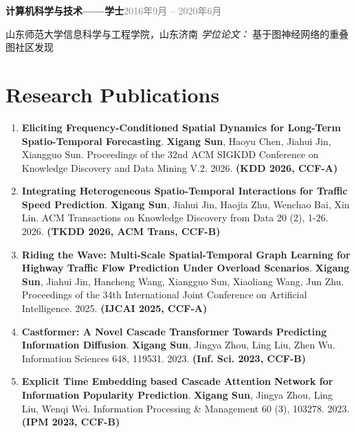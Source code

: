 \documentclass[11pt,a4paper,UTF8]{ctexart}
\newcommand{\cvdate}[1]{{\small\textcolor{gray}{#1}}}
\newcommand{\cvitem}[2]{\textbf{#1}\hfill\cvdate{#2}}
\begin{document}
\vspace{2pt}

\noindent
\cvitem{\textbf{计算机科学与技术——学士}}{2016年9月 -- 2020年6月}

\noindent
\hspace*{1em} 山东师范大学信息科学与工程学院，山东济南
\hspace*{1em} \textit{学位论文：} 基于图神经网络的重叠图社区发现

\section{Research Publications}

\begin{enumerate}
    \item
    \textbf{Eliciting Frequency-Conditioned Spatial Dynamics for Long-Term Spatio-Temporal Forecasting}. \textbf{Xigang Sun}, Haoyu Chen, Jiahui Jin, Xiangguo Sun. Proceedings of the 32nd ACM SIGKDD Conference on Knowledge Discovery and Data Mining V.2. 2026. \textbf{(KDD 2026, CCF-A)}

    \item
    \textbf{Integrating Heterogeneous Spatio-Temporal Interactions for Traffic Speed Prediction}. \textbf{Xigang Sun}, Jiahui Jin, Haojia Zhu, Wenchao Bai, Xin Lin. ACM Transactions on Knowledge Discovery from Data 20 (2), 1-26. 2026. \textbf{(TKDD 2026, ACM Trans, CCF-B)}

    \item
    \textbf{Riding the Wave: Multi-Scale Spatial-Temporal Graph Learning for Highway Traffic Flow Prediction Under Overload Scenarios}. \textbf{Xigang Sun}, Jiahui Jin, Hancheng Wang, Xiangguo Sun, Xiaoliang Wang, Jun Zhu. Proceedings of the 34th International Joint Conference on Artificial Intelligence. 2025. \textbf{(IJCAI 2025, CCF-A)}

    \item
    \textbf{Castformer: A Novel Cascade Transformer Towards Predicting Information Diffusion}. \textbf{Xigang Sun}, Jingya Zhou, Ling Liu, Zhen Wu. Information Sciences 648, 119531. 2023. \textbf{(Inf. Sci. 2023, CCF-B)}

    \item
    \textbf{Explicit Time Embedding based Cascade Attention Network for Information Popularity Prediction}. \textbf{Xigang Sun}, Jingya Zhou, Ling Liu, Wenqi Wei. Information Processing \& Management 60 (3), 103278. 2023. \textbf{(IPM 2023, CCF-B)}
\end{enumerate}
\end{document}
